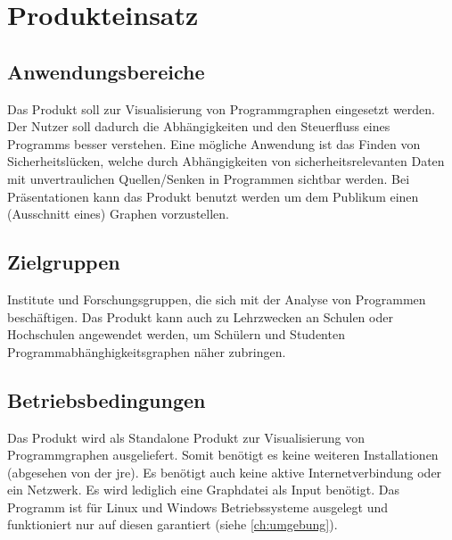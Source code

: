 \chapter{Produkteinsatz}\label{ch:einsatz}

\section{Anwendungsbereiche}
Das Produkt soll zur Visualisierung von Programmgraphen eingesetzt werden.
Der Nutzer soll dadurch die Abhängigkeiten und den Steuerfluss eines Programms besser verstehen.
Eine mögliche Anwendung ist das Finden von Sicherheitslücken, welche durch Abhängigkeiten von sicherheitsrelevanten Daten mit unvertraulichen Quellen/Senken in Programmen sichtbar werden.
Bei Präsentationen kann das Produkt benutzt werden um dem Publikum einen (Ausschnitt eines) Graphen vorzustellen.

\section{Zielgruppen}
Institute und Forschungsgruppen, die sich mit der Analyse von Programmen beschäftigen.
Das Produkt kann auch zu Lehrzwecken an Schulen oder Hochschulen angewendet werden, um Schülern und Studenten Programmabhänghigkeitsgraphen näher zubringen.

\section{Betriebsbedingungen}
Das Produkt wird als Standalone Produkt zur Visualisierung von Programmgraphen ausgeliefert.
Somit benötigt es keine weiteren Installationen (abgesehen von der \gls{jre}).
Es benötigt auch keine aktive Internetverbindung oder ein Netzwerk.
Es wird lediglich eine Graphdatei als Input benötigt.
Das Programm ist für Linux und Windows Betriebssysteme ausgelegt und funktioniert nur auf diesen garantiert (siehe \autoref{ch:umgebung}).
